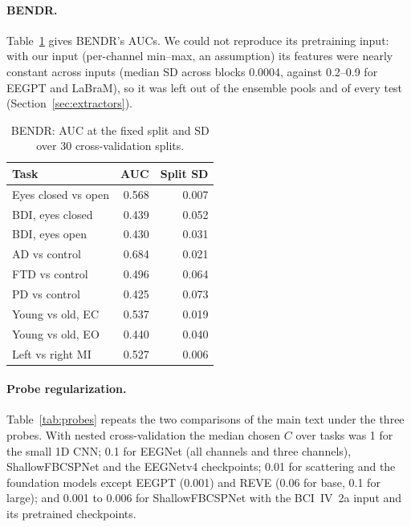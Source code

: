 \documentclass[11pt]{article}
\begin{document}
\paragraph{BENDR.} Table~\ref{tab:bendr} gives BENDR's AUCs. We could not reproduce its
pretraining input: with our input (per-channel min--max, an assumption) its features were nearly
constant across inputs (median SD across blocks 0.0004, against 0.2--0.9 for EEGPT and LaBraM), so it was
left out of the ensemble pools and of every test (Section~\ref{sec:extractors}).

\begin{table}[h]
\centering\footnotesize\setlength{\tabcolsep}{4pt}
\caption{BENDR: AUC at the fixed split and SD over 30 cross-validation splits.}
\label{tab:bendr}
\begin{tabular}{@{}lrr@{}}
\toprule
Task & AUC & Split SD \\
\midrule
Eyes closed vs open & 0.568 & 0.007 \\
BDI, eyes closed & 0.439 & 0.052 \\
BDI, eyes open & 0.430 & 0.031 \\
AD vs control & 0.684 & 0.021 \\
FTD vs control & 0.496 & 0.064 \\
PD vs control & 0.425 & 0.073 \\
Young vs old, EC & 0.537 & 0.019 \\
Young vs old, EO & 0.440 & 0.040 \\
Left vs right MI & 0.527 & 0.006 \\
\bottomrule
\end{tabular}
\end{table}

\paragraph{Probe regularization.} Table~\ref{tab:probes} repeats the two comparisons of the main
text under the three probes. With nested cross-validation the median chosen $C$ over tasks was 1
for the small 1D CNN; 0.1 for EEGNet (all channels and three channels), ShallowFBCSPNet and the
EEGNetv4 checkpoints; 0.01 for scattering and the foundation models except EEGPT (0.001) and REVE (0.06 for base, 0.1 for
large); and
0.001 to 0.006 for ShallowFBCSPNet with the BCI~IV~2a input and its pretrained checkpoints.
\end{document}
